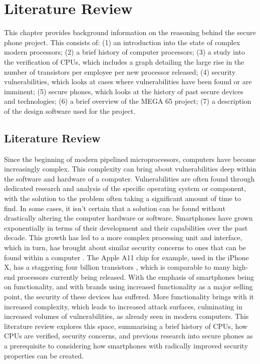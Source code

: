 
\chapter{Literature Review} %

\label{Chapter2} %

This chapter provides background information on the reasoning behind the secure phone project. This consists of: (1) an introduction into the state of complex modern processors; (2) a brief history of computer processors; (3) a study into the verification of CPUs, which includes a graph detailing the large rise in the number of transistors per employee per new processor released; (4) security vulnerabilities, which looks at cases where vulnerabilities have been found or are imminent; (5) secure phones, which looks at the history of past secure devices and technologies; (6) a brief overview of the MEGA 65 project; (7) a description of the design software used for the project.\\


\section{Literature Review}

Since the beginning of modern pipelined microprocessors, computers have become increasingly complex. This complexity can bring about vulnerabilities deep within the software and hardware of a computer. Vulnerabilities are often found through dedicated research and analysis of the specific operating system or component, with the solution to the problem often taking a significant amount of time to find. In some cases, it isn’t certain that a solution can be found without drastically altering the computer hardware or software. 
Smartphones have grown exponentially in terms of their development and their capabilities over the past decade. This growth has led to a more complex processing unit and interface, which in turn, has brought about similar security concerns to ones that can be found within a computer \cite{RN27}. The Apple A11 chip for example, used in the iPhone X, has a staggering four billion transistors \cite{RN28}, which is comparable to many high-end processors currently being released. With the emphasis of smartphones being on functionality, and with brands using increased functionality as a major selling point, the security of these devices has suffered. More functionality brings with it increased complexity, which leads to increased attack surfaces, culminating in increased volumes of vulnerabilities, as already seen in modern computers.
This literature review explores this space, summarising a brief history of CPUs, how CPUs are verified, security concerns, and previous research into secure phones as a prerequisite to considering how smartphones with radically improved security properties can be created.

